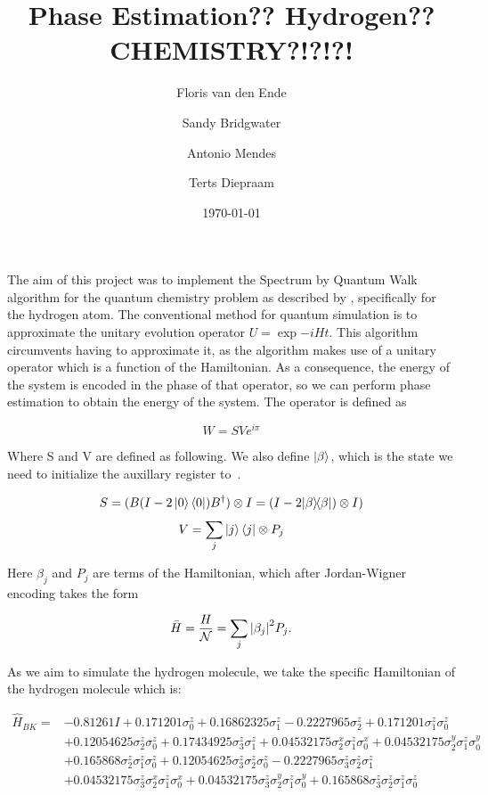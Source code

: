 \documentclass{article}
\title{Phase Estimation?? Hydrogen?? CHEMISTRY?!?!?!}
\author{Floris van den Ende\and Sandy Bridgwater\and Antonio Mendes\and Terts Diepraam}
\date{\today}
\def\kb#1#2{| #1 \rangle\!\langle #2 |}
\begin{document}
\maketitle

The aim of this project was to implement the Spectrum by Quantum Walk algorithm for the quantum chemistry problem as described by \textcite{poulin}, specifically for the hydrogen atom. The conventional method for quantum simulation is to approximate the unitary evolution operator $U = \exp{-iHt}$. This algorithm circumvents having to approximate it, as the algorithm makes use of a unitary operator which is a function of the Hamiltonian. As a consequence, the energy of the system is encoded in the phase of that operator, so we can perform phase estimation to obtain the energy of the system. The operator is defined as

\begin{equation} \label{W}
W = SV e^{i\pi}
\end{equation}

Where S and V are defined as following. We also define $\ket{\beta}$, which is the state we need to initialize the auxillary register to~\cite{poulin}.

\[ S = (B (I - 2 \ket{0}\bra{0}) B^{\dagger}) \otimes I= (I-2\kb \beta \beta) \otimes I) \]
\[ V=\sum_{j}\ket{j}\bra{j} \otimes P_{j} \]

Here $\beta_j$ and $P_j$ are terms of the Hamiltonian, which after Jordan-Wigner encoding takes the form

\begin{equation}
	\bar H = \frac H{\mathcal{N}} = \sum_j\abs{\beta_j}^2 P_j.
\end{equation}

As we aim to simulate the hydrogen molecule, we take the specific Hamiltonian of the hydrogen molecule which is:

\begin{align*}
\hat{H}_{B K}=&-0.81261 I+0.171201 \sigma_{0}^{z}+0.16862325 \sigma_{1}^{z}-0.2227965 \sigma_{2}^{z}+0.171201 \sigma_{1}^{z} \sigma_{0}^{z} \\
&+0.12054625 \sigma_{2}^{z} \sigma_{0}^{z}+0.17434925 \sigma_{3}^{z} \sigma_{1}^{z}+0.04532175 \sigma_{2}^{x} \sigma_{1}^{z} \sigma_{0}^{x}+0.04532175 \sigma_{2}^{y} \sigma_{1}^{z} \sigma_{0}^{y} \\
&+0.165868 \sigma_{2}^{z} \sigma_{1}^{z} \sigma_{0}^{z}+0.12054625 \sigma_{3}^{z} \sigma_{2}^{z} \sigma_{0}^{z}-0.2227965 \sigma_{3}^{z} \sigma_{2}^{z} \sigma_{1}^{z} \\
&+0.04532175 \sigma_{3}^{z} \sigma_{2}^{x} \sigma_{1}^{z} \sigma_{0}^{x}+0.04532175 \sigma_{3}^{z} \sigma_{2}^{y} \sigma_{1}^{z} \sigma_{0}^{y}+0.165868 \sigma_{3}^{z} \sigma_{2}^{z} \sigma_{1}^{z} \sigma_{0}^{z}
\end{align*}
\end{document}
